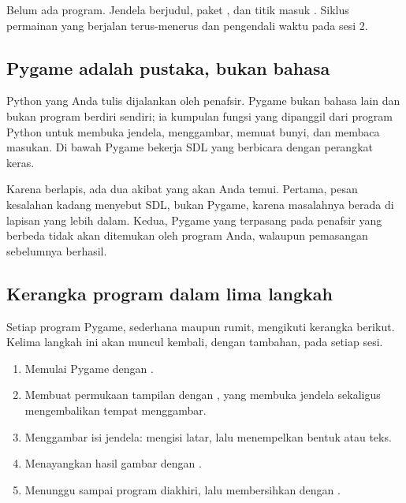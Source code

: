 
\petasesi
  {Belum ada program.}
  {Jendela berjudul, paket , dan titik masuk
   .}
  {Siklus permainan yang berjalan terus-menerus dan pengendali waktu pada
   sesi 2.}


\subsection*{Pygame adalah pustaka, bukan bahasa}

Python yang Anda tulis dijalankan oleh penafsir. Pygame bukan bahasa lain dan
bukan program berdiri sendiri; ia kumpulan fungsi yang dipanggil dari program
Python untuk membuka jendela, menggambar, memuat bunyi, dan membaca masukan.
Di bawah Pygame bekerja SDL yang berbicara dengan perangkat keras.

\begin{center}

\end{center}

Karena berlapis, ada dua akibat yang akan Anda temui. Pertama, pesan kesalahan
kadang menyebut SDL, bukan Pygame, karena masalahnya berada di lapisan yang
lebih dalam. Kedua, Pygame yang terpasang pada penafsir yang berbeda tidak
akan ditemukan oleh program Anda, walaupun pemasangan sebelumnya berhasil.

\subsection*{Kerangka program dalam lima langkah}

Setiap program Pygame, sederhana maupun rumit, mengikuti kerangka berikut.
Kelima langkah ini akan muncul kembali, dengan tambahan, pada setiap sesi.

\begin{enumerate}[leftmargin=1.6em, itemsep=0.25em]
  \item Memulai Pygame dengan .
  \item Membuat permukaan tampilan dengan ,
        yang membuka jendela sekaligus mengembalikan tempat menggambar.
  \item Menggambar isi jendela: mengisi latar, lalu menempelkan bentuk atau
        teks.
  \item Menayangkan hasil gambar dengan .
  \item Menunggu sampai program diakhiri, lalu membersihkan dengan
        .
\end{enumerate}

